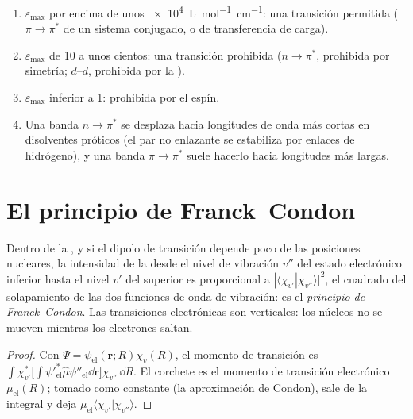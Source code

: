 \begin{method}\label{met:b3:electronic-spectroscopy:assign-band}
\begin{enumerate}
  \item $\varepsilon_{\max}$ por encima de unos \qty{e4}{L.mol^{-1}.cm^{-1}}: una transición
        permitida ($\pi\to\pi^*$ de un sistema conjugado, o de transferencia de carga).
  \item $\varepsilon_{\max}$ de 10 a unos cientos: una transición prohibida ($n\to\pi^*$,
        prohibida por simetría; $d$--$d$, prohibida por la ).
  \item $\varepsilon_{\max}$ inferior a 1: prohibida por el espín.
  \item Una banda $n\to\pi^*$ se desplaza hacia longitudes de onda más cortas en disolventes próticos
        (el par no enlazante se estabiliza por enlaces de hidrógeno), y una banda $\pi\to\pi^*$
        suele hacerlo hacia longitudes más largas.
\end{enumerate}
\end{method}

\section{El principio de Franck--Condon}

\begin{theorem}\label{thm:b3:electronic-spectroscopy:franck-condon}
Dentro de la , y si el dipolo de transición
depende poco de las posiciones nucleares, la intensidad de la  desde el nivel de vibración $v''$ del estado electrónico inferior hasta el nivel
$v'$ del superior es proporcional a $|\langle\chi_{v'}|\chi_{v''}\rangle|^2$, el
cuadrado del solapamiento de las dos funciones de onda de vibración: es el
\emph{principio de Franck--Condon}. Las transiciones
electrónicas son verticales: los núcleos no se mueven mientras los electrones saltan.
\end{theorem}

\begin{proof}
Con $\Psi = \psi_{\mathrm{el}}(\mathbf r;R)\chi_v(R)$, el momento de transición es
$\int\chi_{v'}^*\big[\int\psi'^*_{\mathrm{el}}\hat\mu\psi''_{\mathrm{el}}\dd\mathbf r\big]
\chi_{v''}\,\dd R$. El corchete es el momento de transición electrónico
$\mu_{\mathrm{el}}(R)$; tomado como constante (la aproximación de Condon), sale de
la integral y deja $\mu_{\mathrm{el}}\langle\chi_{v'}|\chi_{v''}\rangle$.
\end{proof}

